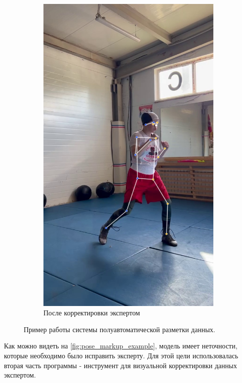 \begin{figure}[h]
\begin{subfigure}[b]{0.32\textwidth}
	\includegraphics[width=\textwidth]{./images/data_info/pose_markup_examples/correct_labels}
	\caption{После корректировки экспертом}
\end{subfigure}
\caption{Пример работы системы полуавтоматической разметки данных.}
\label{fig:pose_markup_example}
\end{figure}

Как можно видеть на \autoref{fig:pose_markup_example}, модель имеет неточности, которые необходимо было исправить эксперту. Для этой цели использовалась вторая часть программы - инструмент для визуальной корректировки данных экспертом. 

